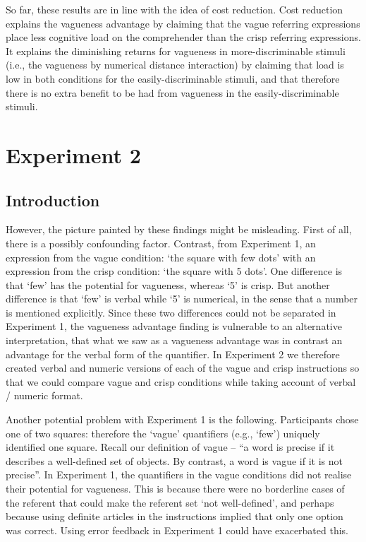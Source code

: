 \documentclass[%
man,		%
floatsintext,%
apacite%
]{apa6}
\begin{document}
So far, these results are in line with the idea of cost reduction. Cost reduction explains the vagueness advantage by claiming that the vague referring expressions place less cognitive load on the comprehender than the crisp referring expressions. It explains the diminishing returns for vagueness in more-discriminable stimuli (i.e., the vagueness by numerical distance interaction) by claiming that load is low in both conditions for the easily-discriminable stimuli, and that therefore there is no extra benefit to be had from vagueness in the easily-discriminable stimuli.


\section{Experiment 2}

\subsection{Introduction} %


However, the picture painted by these findings might be misleading. First of all, there is a possibly confounding factor. Contrast, from Experiment 1, an expression from the vague condition: `the square with few dots' with an expression from the crisp condition: `the square with 5 dots'. 
One difference is that `few' has the potential for vagueness, whereas `5' is crisp. But
another difference is that `few' is verbal while `5' is numerical, in the sense that a number is mentioned explicitly. 
Since these two differences could not be separated in Experiment 1, the vagueness advantage finding is vulnerable to an alternative interpretation, that what we saw as a vagueness advantage was in contrast an advantage for the verbal form of the quantifier. 
In Experiment 2 we therefore created verbal and numeric versions of each of the vague and crisp instructions so that we could compare vague and crisp conditions while taking account of verbal / numeric format.

Another potential problem with Experiment 1 is the following. Participants chose one of two squares: therefore the `vague' quantifiers (e.g., `few') uniquely identified one square. Recall our definition of vague  -- ``a word is precise if it describes a well-defined set of objects. By contrast, a word is vague if it is not precise''.  In Experiment 1, the quantifiers in the vague conditions did not realise their potential for vagueness. This is because there were no borderline cases of the referent that could make the referent set `not well-defined', and perhaps because using definite articles in the instructions implied that only one option was correct.
Using error feedback in Experiment 1 could have exacerbated this.
\end{document}
